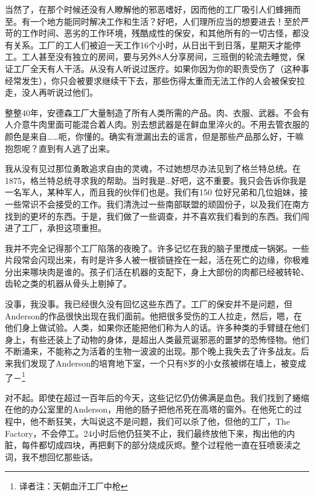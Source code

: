 \documentclass[openany,a4paper]{book} %
\begin{document}
当然了，在那个时候还没有人瞭解他的邪恶嗜好，因而他的工厂吸引人们蜂拥而至。有一个地方能同时解决工作和生活？好吧，人们理所应当的想要进去！至於严苛的工作时间、恶劣的工作环境，残酷成性的保安，和其他所有的一切古怪，都没有关系。工厂的工人们被迫一天工作16个小时，从日出干到日落，星期天才能停工。工人甚至没有独立的房间，要与另外8人分享房间，三班倒的轮流去睡觉，保证工厂全天有人干活。从没有人听说过医疗。如果你因为你的职责受伤了（这种事经常发生），你只会被要求继续干下去，那些伤得太重而无法工作的人会被保安拉走，没人再听说过他们。\vspace{12pt}

整整40年，安德森工厂大量制造了所有人类所需的产品。肉、衣服、武器。不会有人介意牛肉里面可能混合着人肉。別去想武器是在鲜血里淬火的。不用去管衣服的颜色是来自……呃，你懂的。确实有泄漏出去的谣言，但是那些产品那么好，干嘛抱怨呢？直到有人逃了出来。\vspace{12pt}

我从没有见过那位勇敢追求自由的灵魂，不过她想尽办法见到了格兰特总统。在1875，格兰特总统寻求我的帮助。当时我是…好吧，这不重要。我只会告诉你我是一名军人，某种军人，而且我的伙伴们也是。我们有150 位好兄弟和几位姐妹，接一些常识不会接受的工作。我们清洗过一些南部联盟的顽固份子，以及我们在南方找到的更坏的东西。于是，我们做了一些调查，并不喜欢我们看到的东西。我们闯进了工厂，承担这项重担。\vspace{12pt}

我并不完全记得那个工厂陷落的夜晚了。许多记忆在我的脑子里搅成一锅粥。一些片段常会闪现出来，有时是许多人被一根锁链拴在一起，活在死亡的边缘，你极难分出来哪块肉是谁的。孩子们活在机器的支配下，身上大部份的肉都已经被转轮、齿轮之类的机器从骨头上剔掉了。\vspace{12pt}

没事，我没事。我已经很久没有回忆这些东西了。工厂的保安并不是问题，但Anderson的作品很快出现在我们面前。他把很多受伤的工人拉走，然后，嗯，在他们身上做试验。人类，如果你还能把他们称为人的话。许多种类的手臂缝在他们身上，有些还装上了动物的身体，是超出人类最荒诞邪恶的噩梦的恐怖怪物。他们不断涌来，不能称之为活着的生物一波波的出现。那个晚上我失去了许多战友。后来我们发现了Anderson的培育地下室，一个只有8岁的小女孩被绑在墙上，被变成了－\footnote{译者注：天朝血汗工厂中枪}\vspace{12pt}

对不起。即使在超过一百年后的今天，这些记忆仍仿佛满是血色。我们找到了蜷缩在他的办公室里的Anderson，用他的肠子把他吊死在高塔的窗外。在他死亡的过程中，他不断狂笑，大叫说这不是问题，我们可以杀了他，但他的工厂，The Factory，不会停工。24小时后他仍狂笑不止，我们最终放他下来，掏出他的内脏，每件都切成四块，再把剩下的部分烧成灰烬。整个过程他一直在狂喷亵渎之词，我不想回忆那些话。\vspace{12pt}
\end{document}

